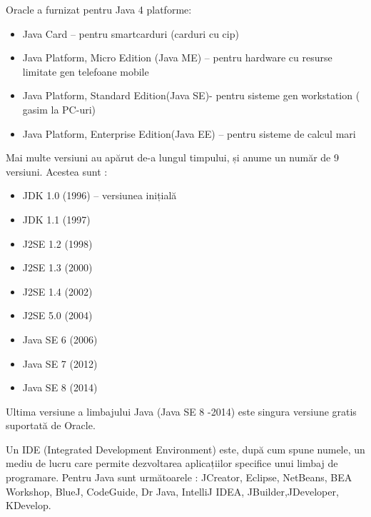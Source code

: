 \documentclass[12pt]{book}
\begin{document}
\bigbreak	
Oracle a furnizat pentru Java 4 platforme:
\begin{addmargin}[4em]{1em}
\begin{itemize}
	\item Java Card – pentru smartcarduri (carduri cu cip)
	\item Java Platform, Micro Edition (Java ME) – pentru hardware cu resurse limitate gen telefoane mobile
	\item Java Platform, Standard Edition(Java SE)- pentru sisteme gen workstation ( gasim la PC-uri)
	\item Java Platform, Enterprise Edition(Java EE) – pentru sisteme de calcul mari \cite{thinkJava}
\end{itemize}
\end{addmargin}
\bigbreak
Mai multe versiuni au apărut de-a lungul timpului, și anume un număr de 9 versiuni. Acestea sunt :
\begin{addmargin}[4em]{1em}
\begin{itemize}
\item JDK 1.0 (1996) – versiunea inițială
\item JDK 1.1 (1997)
\item J2SE 1.2 (1998)
\item J2SE 1.3 (2000)
\item J2SE 1.4 (2002)
\item J2SE 5.0 (2004)
\item Java SE 6 (2006)
\item Java SE 7 (2012)
\item Java SE 8 (2014) 
\end{itemize}
\end{addmargin}
\bigbreak
Ultima versiune a limbajului Java (Java SE 8 -2014) este singura versiune gratis suportată de Oracle. \cite{cursPracticJava}
	
Un IDE (Integrated Development Environment) este, după cum spune numele, un mediu de lucru care permite dezvoltarea aplicațiilor specifice unui limbaj de programare. Pentru Java sunt următoarele : JCreator, Eclipse, NetBeans, BEA Workshop, BlueJ, CodeGuide, Dr Java, IntelliJ IDEA, JBuilder,JDeveloper, KDevelop.
	
\end{document}
